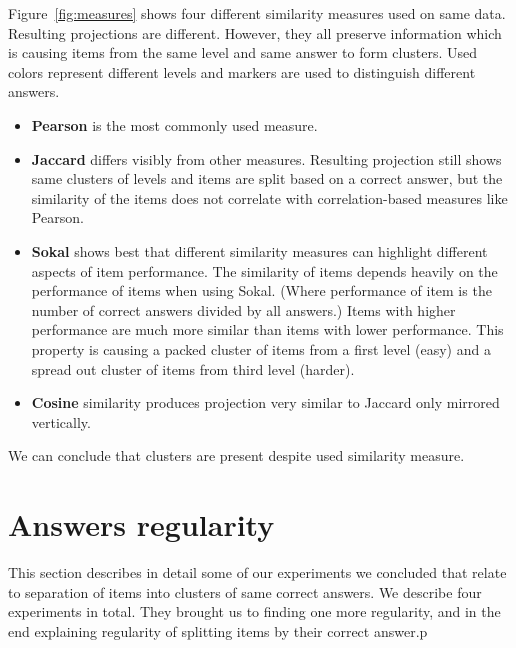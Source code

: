 \documentclass[
  printed, %
  table,   %
  nolof,     %
  nolot,     %
  color,
  final,
  nocover
]{fithesis3}
\begin{document}

Figure~\ref{fig:measures} shows four different similarity measures used on same data. Resulting projections are different. However, they all preserve information which is causing items from the same level and same answer to form clusters. Used colors represent different levels and markers are used to distinguish different answers.


\begin{itemize}
\item
  \textbf{Pearson} is the most commonly used measure.

\item
  \textbf{Jaccard} differs visibly from other measures. Resulting projection still shows same clusters of levels and items are split based on a correct answer, but the similarity of the items does not correlate with correlation-based measures like Pearson.

\item
  \textbf{Sokal} shows best that different similarity measures can highlight different aspects of item performance. The similarity of items depends heavily on the performance of items when using Sokal. (Where performance of item is the number of correct answers divided by all answers.) Items with higher performance are much more similar than items with lower performance. This property is causing a packed cluster of items from a first level (easy) and a spread out cluster of items from third level (harder).

\item
  \textbf{Cosine} similarity produces projection very similar to Jaccard only mirrored vertically.
\end{itemize}

We can conclude that clusters are present despite used similarity measure.


\section{Answers regularity}\label{evaulation-answers-regularity}

This section describes in detail some of our experiments we concluded that relate to separation of items into clusters of same correct answers. We describe four experiments in total. They brought us to finding one more regularity, and in the end explaining regularity of splitting items by their correct answer.p
\end{document}
